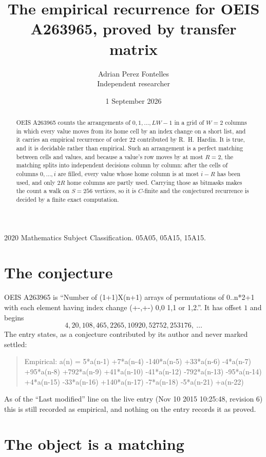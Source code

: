 \documentclass[11pt,a4paper]{article}
\title{The empirical recurrence for OEIS A263965, proved by transfer matrix}
\author{Adrian Perez Fontelles\\ \small Independent researcher}
\date{1 September 2026}
\theoremstyle{plain}
\theoremstyle{definition}
\begin{document}
\maketitle

\begin{abstract}
OEIS A263965 counts the arrangements of $0,1,\dots,LW-1$ in a grid of $W=2$ columns in which
every value moves from its home cell by an index change on a short list, and it carries an
empirical recurrence of order $22$ contributed by R.~H.~Hardin. It is true, and it is
decidable rather than empirical. Such an arrangement is a perfect matching between cells and
values, and because a value's row moves by at most $R=2$, the matching splits into
independent decisions column by column: after the cells of columns $0,\dots,i$ are filled,
every value whose home column is at most $i-R$ has been used, and only $2R$ home columns are
partly used. Carrying those as bitmasks makes the count a walk on $S=256$ vertices, so it is
$C$-finite and the conjectured recurrence is decided by a finite exact computation.
\end{abstract}

\noindent\small 2020 Mathematics Subject Classification. 05A05, 05A15, 15A15.\normalsize

\section{The conjecture}

OEIS A263965 is ``Number of (1+1)X(n+1) arrays of permutations of 0..n*2+1 with each element having index change (+-,+-) 0,0 1,1 or 1,2.''. It has offset $1$ and begins
\[
4, 20, 108, 465, 2265, 10920, 52752, 253176,\ \dots
\]
The entry states, as a conjecture contributed by its author and never marked settled:
\begin{quote}
Empirical: a(n) = 5*a(n-1) +7*a(n-4) -140*a(n-5) +33*a(n-6) -4*a(n-7) +95*a(n-8) +792*a(n-9) +41*a(n-10) -41*a(n-12) -792*a(n-13) -95*a(n-14) +4*a(n-15) -33*a(n-16) +140*a(n-17) -7*a(n-18) -5*a(n-21) +a(n-22)
\end{quote}
As of the ``Last modified'' line on the live entry (Nov 10 2015 10:25:48, revision 6) this is still
recorded as empirical, and nothing on the entry records it as proved.

\section{The object is a matching}
\end{document}
